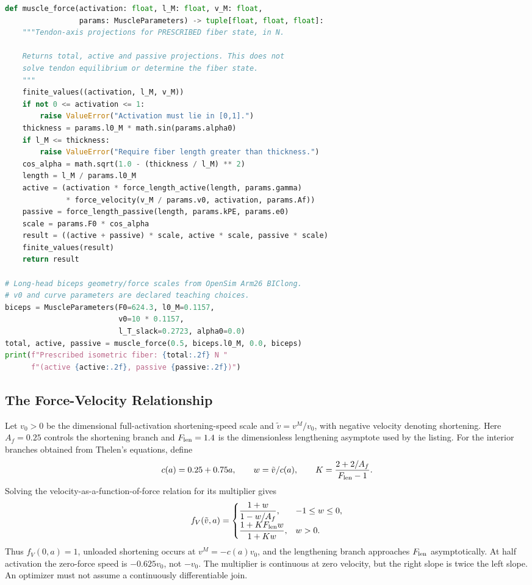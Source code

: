 \begin{lstlisting}[language=Python, caption={Prescribed-Fiber Constitutive Evaluation.}]
def muscle_force(activation: float, l_M: float, v_M: float,
                 params: MuscleParameters) -> tuple[float, float, float]:
    """Tendon-axis projections for PRESCRIBED fiber state, in N.

    Returns total, active and passive projections. This does not
    solve tendon equilibrium or determine the fiber state.
    """
    finite_values((activation, l_M, v_M))
    if not 0 <= activation <= 1:
        raise ValueError("Activation must lie in [0,1].")
    thickness = params.l0_M * math.sin(params.alpha0)
    if l_M <= thickness:
        raise ValueError("Require fiber length greater than thickness.")
    cos_alpha = math.sqrt(1.0 - (thickness / l_M) ** 2)
    length = l_M / params.l0_M
    active = (activation * force_length_active(length, params.gamma)
              * force_velocity(v_M / params.v0, activation, params.Af))
    passive = force_length_passive(length, params.kPE, params.e0)
    scale = params.F0 * cos_alpha
    result = ((active + passive) * scale, active * scale, passive * scale)
    finite_values(result)
    return result

# Long-head biceps geometry/force scales from OpenSim Arm26 BIClong.
# v0 and curve parameters are declared teaching choices.
biceps = MuscleParameters(F0=624.3, l0_M=0.1157,
                          v0=10 * 0.1157,
                          l_T_slack=0.2723, alpha0=0.0)
total, active, passive = muscle_force(0.5, biceps.l0_M, 0.0, biceps)
print(f"Prescribed isometric fiber: {total:.2f} N "
      f"(active {active:.2f}, passive {passive:.2f})")
\end{lstlisting}

\subsection{The Force-Velocity Relationship}

Let $v_0>0$ be the dimensional full-activation shortening-speed scale and
$\tilde v=v^M/v_0$, with negative velocity denoting shortening.
Here $A_f=0.25$ controls the shortening branch and $F_{\rm len}=1.4$
is the dimensionless lengthening asymptote used by the listing.
For the interior branches obtained from Thelen's equations, define
\[
 c(a)=0.25+0.75a,\qquad w=\tilde v/c(a),\qquad
 K=\frac{2+2/A_f}{F_{\rm len}-1}.
\]
Solving the velocity-as-a-function-of-force relation for its multiplier gives
\begin{equation}
 f_V(\tilde v,a)=
 \begin{cases}
 \dfrac{1+w}{1-w/A_f},&-1\leq w\leq0,\\[3pt]
 \dfrac{1+K F_{\rm len}w}{1+K w},&w>0.
 \end{cases}
 \label{eq:ch3:force-velocity}
\end{equation}
Thus $f_V(0,a)=1$, unloaded shortening occurs at $v^M=-c(a)v_0$,
and the lengthening branch approaches $F_{\rm len}$ asymptotically.
At half activation the zero-force speed is $-0.625v_0$, not $-v_0$.
The multiplier is continuous at zero velocity, but the right slope is twice
the left slope. An optimizer must not assume a continuously differentiable join.

